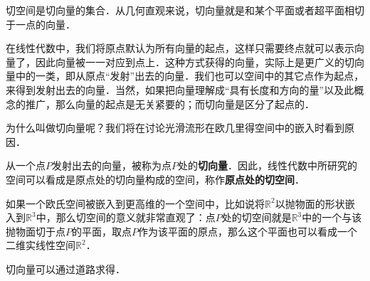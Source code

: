 

切空间是切向量的集合．从几何直观来说，切向量就是和某个平面或者超平面相切于一点的向量．

在线性代数中，我们将原点默认为所有向量的起点，这样只需要终点就可以表示向量了，因此向量被一一对应到点上．这种方式获得的向量，实际上是更广义的切向量中的一类，即从原点“发射”出去的向量．我们也可以空间中的其它点作为起点，来得到发射出去的向量．当然，如果把向量理解成“具有长度和方向的量”以及此概念的推广，那么向量的起点是无关紧要的；而切向量是区分了起点的．

为什么叫做切向量呢？我们将在讨论光滑流形在欧几里得空间中的嵌入时看到原因．%

从一个点$P$发射出去的向量，被称为点$P$处的\textbf{切向量}．因此，线性代数中所研究的空间可以看成是原点处的切向量构成的空间，称作\textbf{原点处的切空间}．

如果一个欧氏空间被嵌入到更高维的一个空间中，比如说将$\mathbb{R}^2$以抛物面的形状嵌入到$\mathbb{R}^3$中，那么切空间的意义就非常直观了：点$P$处的切空间就是$\mathbb{R}^3$中的一个与该抛物面切于点$P$的平面，取点$P$作为该平面的原点，那么这个平面也可以看成一个二维实线性空间$\mathbb{R}^2$．



切向量可以通过道路求得．


